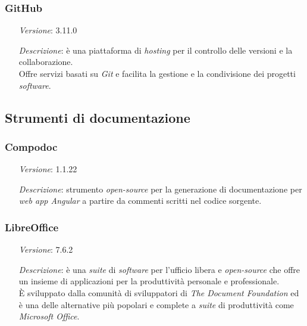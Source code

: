     \subsubsection*{GitHub}
    \begin{itemize}
        \item [\textit{Versione}:] 3.11.0
        \item [\textit{Descrizione}:] è una piattaforma di \textit{hosting} per il controllo delle versioni e la collaborazione. \\
                    Offre servizi basati su \textit{Git} e facilita la gestione e la condivisione dei progetti \textit{software}.
    \end{itemize}

\subsection{Strumenti di documentazione}

\subsubsection*{Compodoc}
\begin{itemize}
    \item [\textit{Versione}:] 1.1.22
    \item [\textit{Descrizione}:] strumento \textit{open-source} per la generazione di documentazione per \textit{web app Angular} a partire da commenti scritti nel codice sorgente.
\end{itemize}

\subsubsection*{LibreOffice}
\begin{itemize}
    \item [\textit{Versione}:] 7.6.2
    \item [\textit{Descrizione}:] è una \textit{suite} di \textit{software} per l'ufficio libera e \textit{open-source} che offre un insieme di applicazioni per la produttività personale e professionale. \\
                È sviluppato dalla comunità di sviluppatori di \textit{The Document Foundation} ed è una delle alternative più popolari e complete a \textit{suite} di produttività come \textit{Microsoft Office}.
\end{itemize}

